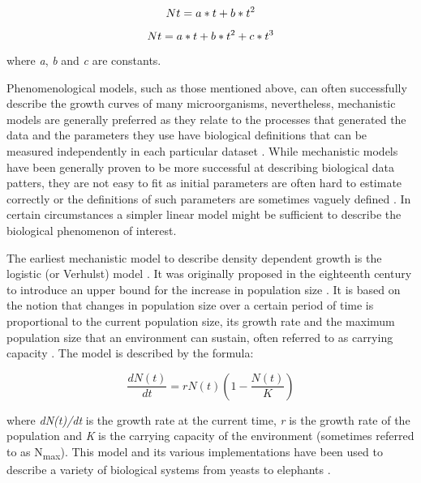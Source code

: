 \documentclass[a4paper]{article}
\begin{document}
\begin{equation}
\label{eqn:quadratic} 
Nt= a*t + b* t\textsuperscript{2}  
\end{equation}

\begin{equation}
\label{eqn:cubic}
Nt = a*t + b* t\textsuperscript{2} + c*t\textsuperscript{3} \end{equation}

where \textit{a}, \textit{b} and \textit{c} are constants.\par

Phenomenological models, such as those mentioned above, can often successfully describe the growth curves of many microorganisms, nevertheless, mechanistic models are generally preferred as they relate to the processes that generated the data and the parameters they use have biological definitions that can be measured independently in each particular dataset \citep{liberles2013need}. While mechanistic models have been generally proven to be more successful at describing biological data patters, they are not easy to fit as initial parameters are often hard to estimate correctly or the definitions of such parameters are sometimes vaguely defined \citep{levins1966strategy}. In certain circumstances a simpler linear model might be sufficient to describe the biological phenomenon of interest. \par

The earliest mechanistic model to describe density dependent growth is the logistic (or Verhulst) model \citep{verhulst1838notice}. It was originally proposed in the eighteenth century to introduce an upper bound for the increase in population size \citep{TSOULARIS200221}. It is based on the notion that changes in population size over a certain period of time is proportional to the current population size, its growth rate and the maximum population size that an environment can sustain, often referred to as carrying capacity \citep{PELEG2007808}. The model is described by the formula: 

\begin{equation}
\label{eqn:logistic}
\frac{dN(t)}{dt} = rN(t) \left( 1- \frac{N(t)}{K} \right) 
\end{equation}

where \textit{dN(t)/dt} is the growth rate at the current time, \textit{r} is the growth rate of the population and \textit{K} is the carrying capacity of the environment (sometimes referred to as N\textsubscript{max}). This model and its various implementations have been used to describe a variety of biological systems from yeasts \citep{carlson1913geschwindigkeit} to elephants \citep{morgan1976stochastic, TSOULARIS200221}. \par
\end{document}
